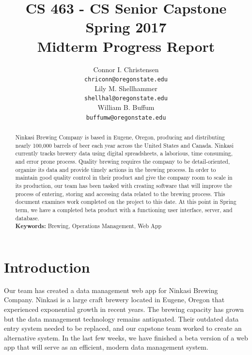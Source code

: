 \documentclass[draftclsnofoot,onecolumn,letterpaper,10pt,compsoc]{IEEEtran}
\title{CS 463 - CS Senior Capstone
	\\Spring 2017
	\\Midterm Progress Report
}
\author{
	Connor I. Christensen \\
	\texttt{chriconn@oregonstate.edu}
	\\
	Lily M. Shellhammer \\
	\texttt{shellhal@oregonstate.edu}
	\\
	William B. Buffum \\
	\texttt{buffumw@oregonstate.edu}
}
\begin{document}
\begin{titlingpage}
    \maketitle
    \begin{abstract}
			Ninkasi Brewing Company is based in Eugene, Oregon, producing and distributing nearly 100,000 barrels of beer each year across the United States and Canada.
			Ninkasi currently tracks brewery data using digital spreadsheets, a laborious, time consuming, and error prone process.
			Quality brewing requires the company to be detail-oriented, organize its data and provide timely actions in the brewing process.
			In order to maintain good quality control in their product and give the company room to scale in its production, our team has been tasked with creating software that will improve the process of entering, storing and accessing data related to the brewing process.
			This document examines work completed on the project to this date.
			At this point in Spring term, we have a completed beta product with a functioning user interface, server, and database.
			\\
			\textbf{Keywords:} Brewing, Operations Management, Web App
    \end{abstract}
		\pagebreak
		\tableofcontents
\end{titlingpage}


\section{Introduction}
Our team has created a data management web app for Ninkasi Brewing Company.
Ninkasi is a large craft brewery located in Eugene, Oregon that experienced exponential growth in recent years.
The brewing capacity has grown but the data management technology remains antiquated.
Their outdated data entry system needed to be replaced, and our capstone team worked to create an alternative system.
In the last few weeks, we have finished a beta version of a web app that will serve as an efficient, modern data management system.
\end{document}
